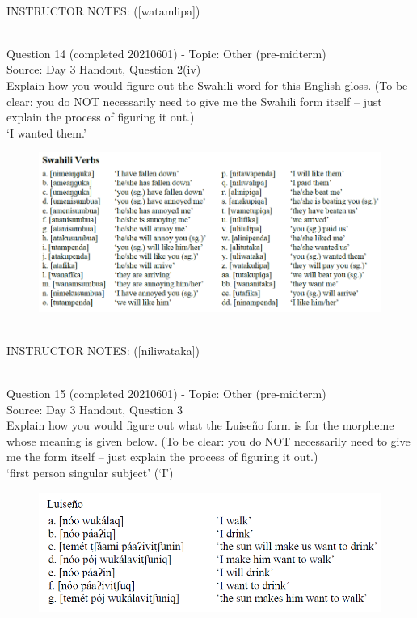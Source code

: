 \documentclass[12pt]{article}
\begin{document}
~\\
INSTRUCTOR NOTES: ([watamlipa])


~\\

{\large Question 14} (completed 20210601) - Topic: Other (pre-midterm)\\
Source: Day 3 Handout, Question 2(iv)\\

Explain how you would figure out the Swahili word for this English gloss. (To be clear: you do NOT necessarily need to give me the Swahili form itself -- just explain the process of figuring it out.)\\

‘I wanted them.’

\begin{figure}[H]
\includegraphics{../images/swahiliverbs.png}
\end{figure}

~\\
INSTRUCTOR NOTES: ([niliwataka])


~\\

{\large Question 15} (completed 20210601) - Topic: Other (pre-midterm)\\
Source: Day 3 Handout, Question 3\\

Explain how you would figure out what the Luiseño form is for the morpheme whose meaning is given below. (To be clear: you do NOT necessarily need to give me the form itself -- just explain the process of figuring it out.)\\

‘first person singular subject’ (‘I’)

\begin{figure}[H]
\includegraphics{../images/luiseno.png}
\end{figure}
\end{document}
